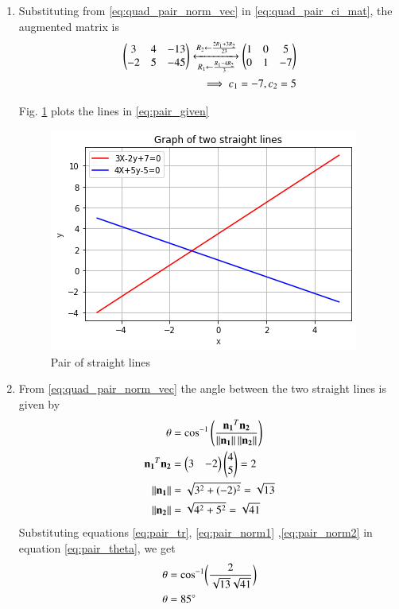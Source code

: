 \begin{enumerate}[label=\thesection.\arabic*.,ref=\thesection.\theenumi]
\item Substituting from \eqref{eq:quad_pair_norm_vec}
in \eqref{eq:quad_pair_ci_mat}, the augmented matrix is
\begin{align}
\begin{pmatrix}
3 & 4 & -13
\\
-2 & 5 & -45
\end{pmatrix}
\xleftrightarrow[R_1 \leftarrow \frac{R_1 - 4R_2}{3}]{R_2 \leftarrow \frac{2R_1 + 3R_2}{23}}
\begin{pmatrix}
1 & 0 & 5
\\
0 & 1 & -7
\end{pmatrix}
\\
\implies c_1 = -7, c_2 = 5
\end{align}

Fig.     \ref{fig:pair} plots the lines in \eqref{eq:pair_given}
%
\begin{figure}[h]
    \centering
    \includegraphics[width=\columnwidth]{./figs/pair/pair_ang.png}
    \caption{Pair of straight lines}
    \label{fig:pair}
\end{figure}

\item From \eqref{eq:quad_pair_norm_vec}
the angle between the two straight lines is given by 
\begin{align}
    \theta&=\cos^{-1}\left(\frac{\mathbf{n_1}^T\mathbf{n_2}}{\left\lVert\mathbf{n_1}\right\rVert\left\lVert\mathbf{n_2}\right\rVert}\right)
\label{eq:pair_theta}
\\
    \mathbf{n_1}^T\mathbf{n_2}&=\begin{pmatrix}3 & -2\end{pmatrix}\begin{pmatrix}4\\5\end{pmatrix}=2\label{eq:pair_tr}\\
    \left\lVert\mathbf{n_1}\right\rVert&=\sqrt{3^2+(-2)^2}=\sqrt{13}\label{eq:pair_norm1}\\
    \left\lVert\mathbf{n_2}\right\rVert&=\sqrt{4^2+5^2}=\sqrt{41}\label{eq:pair_norm2}
\end{align}
Substituting equations \eqref{eq:pair_tr}, \eqref{eq:pair_norm1} ,\eqref{eq:pair_norm2} in equation \eqref{eq:pair_theta}, we get 
\begin{align}
        \theta&=\cos^{-1}\biggl(\frac{2}{\sqrt{13}\sqrt{41}}\biggr)\\
        \theta&=85\degree
\end{align}


\end{enumerate}

